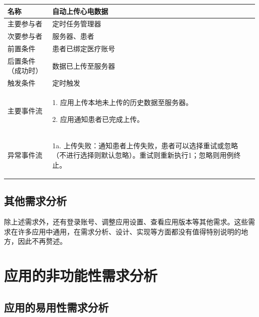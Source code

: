 \begin{table}[!ht]
    \label{tab:uc-upload}
    \begin{tabularx}{\textwidth}{|l|X|}
        \hline
        名称        & 自动上传心电数据  \\
        \hline
        主要参与者     & 定时任务管理器   \\
        \hline
        次要参与者     & 服务器、患者    \\
        \hline
        前置条件      & 患者已绑定医疗账号 \\
        \hline
        后置条件（成功时） & 数据已上传至服务器 \\
        \hline
        触发条件      & 定时触发      \\
        \hline
        主要事件流 &
        \begin{itemizec}
            \item[1.] 应用上传本地未上传的历史数据至服务器。
            \item[2.] 应用通知患者已完成上传。
        \end{itemizec} \\
        \hline
        异常事件流 &
        \begin{itemizec}
            \item[1a.] 上传失败：通知患者上传失败，患者可以选择重试或忽略（不进行选择则默认忽略）。重试则重新执行1；忽略则用例终止。
        \end{itemizec} \\
        \hline
    \end{tabularx}
\end{table}

\subsection{其他需求分析}\label{subsec:other-req}

除上述需求外，还有登录账号、调整应用设置、查看应用版本等其他需求。这些需求在许多应用中通用，在需求分析、设计、实现等方面都没有值得特别说明的地方，因此不再赘述。


\section{应用的非功能性需求分析}\label{sec:nonfunc-req}

\subsection{应用的易用性需求分析}\label{subsec:usability}

